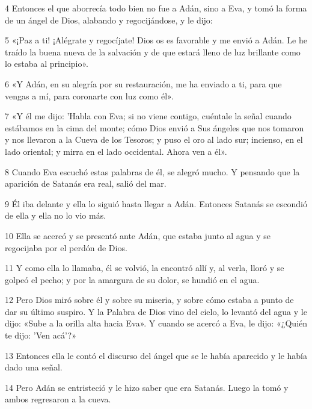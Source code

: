 \par 4 Entonces el que aborrecía todo bien no fue a Adán, sino a Eva, y tomó la forma de un ángel de Dios, alabando y regocijándose, y le dijo:

\par 5 «¡Paz a ti! ¡Alégrate y regocíjate! Dios os es favorable y me envió a Adán. Le he traído la buena nueva de la salvación y de que estará lleno de luz brillante como lo estaba al principio».

\par 6 «Y Adán, en su alegría por su restauración, me ha enviado a ti, para que vengas a mí, para coronarte con luz como él».

\par 7 «Y él me dijo: 'Habla con Eva; si no viene contigo, cuéntale la señal cuando estábamos en la cima del monte; cómo Dios envió a Sus ángeles que nos tomaron y nos llevaron a la Cueva de los Tesoros; y puso el oro al lado sur; incienso, en el lado oriental; y mirra en el lado occidental. Ahora ven a él».

\par 8 Cuando Eva escuchó estas palabras de él, se alegró mucho. Y pensando que la aparición de Satanás era real, salió del mar.

\par 9 Él iba delante y ella lo siguió hasta llegar a Adán. Entonces Satanás se escondió de ella y ella no lo vio más.

\par 10 Ella se acercó y se presentó ante Adán, que estaba junto al agua y se regocijaba por el perdón de Dios.

\par 11 Y como ella lo llamaba, él se volvió, la encontró allí y, al verla, lloró y se golpeó el pecho; y por la amargura de su dolor, se hundió en el agua.

\par 12 Pero Dios miró sobre él y sobre su miseria, y sobre cómo estaba a punto de dar su último suspiro. Y la Palabra de Dios vino del cielo, lo levantó del agua y le dijo: «Sube a la orilla alta hacia Eva». Y cuando se acercó a Eva, le dijo: «¿Quién te dijo: 'Ven acá'?»

\par 13 Entonces ella le contó el discurso del ángel que se le había aparecido y le había dado una señal.

\par 14 Pero Adán se entristeció y le hizo saber que era Satanás. Luego la tomó y ambos regresaron a la cueva.

